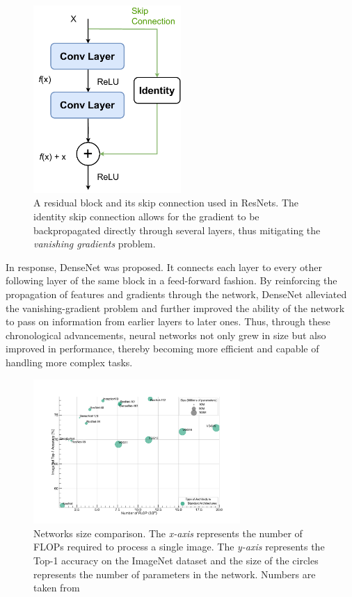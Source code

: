 \begin{figure}[htbp]
  \centering
  \includegraphics[width=0.5\textwidth]{chapter_dlo/assets/skip_connection.pdf}
  \caption{A residual block and its skip connection used in
    ResNets\cite{DBLP:conf/cvpr/HeZRS16}. The identity skip connection allows
    for the gradient to be backpropagated directly through several layers, thus
    mitigating the \emph{vanishing gradients} problem.}
  \label{fig:dlo:skip_connection}
\end{figure}

In response, DenseNet \cite{huang2017densely} was proposed. It connects each
layer to every other following layer of the same block in a feed-forward
fashion. By reinforcing the propagation of features and gradients through the
network, DenseNet alleviated the vanishing-gradient problem and further improved
the ability of the network to pass on information from earlier layers to later
ones. Thus, through these chronological advancements, neural networks not only
grew in size but also improved in performance, thereby becoming more efficient
and capable of handling more complex tasks.\\

\begin{figure}[htbp]
  \centering
  \includegraphics[width=0.7\textwidth]{chapter_sota/assets/network_sizes_normal.pdf}
  \caption{Networks size comparison. The \emph{x-axis} represents the number of
    \acp{FLOP} required to process a single image. The \emph{y-axis} represents
    the Top-1 accuracy on the ImageNet \cite{deng2009imagenet} dataset and the
    size of the circles represents the number of parameters in the network.
    Numbers are taken from \cite{pytorch_vision}}
  \label{fig:dlo:net_sizes}
\end{figure}

